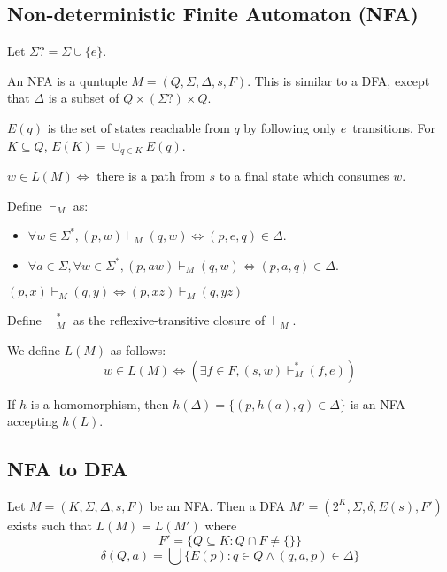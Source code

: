 \subsection[NFA]{Non-deterministic Finite Automaton (NFA)}

Let $\Sigma? = \Sigma \cup \{e\}$.

An NFA is a quntuple $M = (Q, \Sigma, \Delta, s, F)$.
This is similar to a DFA, except that $\Delta$ is a subset of $Q \times (\Sigma?) \times Q$.

$E(q)$ is the set of states reachable from $q$ by following only $e$~transitions.
For $K \subseteq Q$, $E(K) = \cup_{q \in K} E(q)$.

$w \in L(M) \iff$ there is a path from $s$ to a final state which consumes $w$.

Define $\vdash_M$ as:
\begin{itemize}
\item $\forall w \in \Sigma^*, (p, w) \vdash_M (q, w) \iff (p, e, q) \in \Delta$.
\item $\forall a \in \Sigma, \forall w \in \Sigma^*, (p, aw) \vdash_M (q, w) \iff (p, a, q) \in \Delta$.
\end{itemize}

\begin{theorem}$(p, x) \vdash_M (q, y) \iff (p, xz) \vdash_M (q, yz)$\end{theorem}

Define $\vdash_M^*$ as the reflexive-transitive closure of $\vdash_M$.

We define $L(M)$ as follows:
\[ w \in L(M) \iff (\exists f \in F, (s, w) \vdash_M^* (f, e)) \]

\begin{theorem}
If $h$ is a homomorphism, then $h(\Delta) = \{(p, h(a), q) \in \Delta \}$ is an NFA
accepting $h(L)$.
\end{theorem}

\subsection{NFA to DFA}

\begin{theorem}
Let $M = (K, \Sigma, \Delta, s, F)$ be an NFA.
Then a DFA $M' = (2^K, \Sigma, \delta, E(s), F')$ exists such that $L(M) = L(M')$ where
\[ F' = \{Q \subseteq K: Q \cap F \neq \{\}\} \]
\[ \delta(Q, a) = \bigcup \{E(p): q \in Q \wedge (q, a, p) \in \Delta \} \]
\end{theorem}


